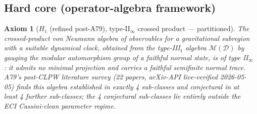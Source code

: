 \documentclass[a4paper,11pt]{article}
\newtheorem*{axiom*}{Axiom}
\theoremstyle{definition}
\theoremstyle{remark}
\begin{document}
\subsection{Hard core (operator-algebra framework)}
\label{sec:axioms-hardcore}

\begin{axiom*}[$H_1$ \textup{(refined post-A79)}, type-II$_\infty$
               crossed product --- partitioned]
The crossed-product von Neumann algebra of observables for a
gravitational subregion with a suitable dynamical clock, obtained
from the type-III$_1$ algebra $\mathcal{M}(\mathcal{D})$ by gauging
the modular automorphism group of a faithful normal state, is of type
II$_\infty$: it admits no minimal projection and carries a faithful
semifinite normal trace.  A79's post-CLPW literature survey
(22 papers, arXiv-API live-verified 2026-05-05) finds this algebra
\emph{established} in exactly 4 sub-classes and \emph{conjectural}
in at least 4 further sub-classes; the 4 conjectural sub-classes lie
entirely outside the ECI Cassini-clean parameter regime.
\end{axiom*}
\end{document}
